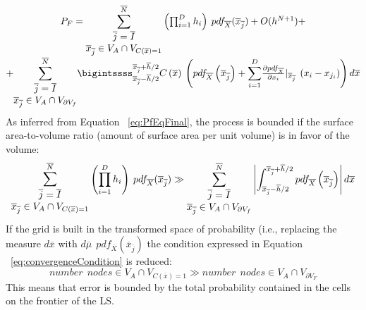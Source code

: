  \begin{equation}
 \label{eq:PfEqFinal}
 \begin{matrix}
P_{F} = \mathlarger{\sum}_{\begin{matrix}
\overline{j}=\overline{I} \\ \overline{x}_{\overline{j}} \in V_{A} \cap 
V_{C(\overline{x})=1} \end{matrix}}^{\overline{N}} 
\left ( \prod_{i=1}^{D} 
 h_{i} \right ) 
\: pdf_{\overline{X}} ( \overline{x}_{\overline{j}}) + O(h^{N+1}) +
 \\
 + \mathlarger{\sum}_{\begin{matrix}
\overline{j}=\overline{I} \\ \overline{x}_{\overline{j}} \in V_{A} \cap 
V_{\partial V_{f}} \end{matrix}}^{\overline{N}}
\bigintssss_{\overline{x}_{\overline{j}} - 
\overline{h}/2}^{\overline{x}_{\overline{j}} + \overline{h}/2} C\left ( 
\overline{x} \right )\: \left ( pdf_{\overline{X}}\left ( 
\overline{x}_{\overline{j}} \right ) +
\mathlarger{\sum}_{i=1}^{D} \frac{\partial pdf_{\overline{X}}}{\partial 
x_{i}}|_{\overline{x}_{\overline{j}}} \: \left ( x_{i} - x_{j_{i}} \right ) \right )   
d\overline{x}
\end{matrix} 
 \end{equation} 
As inferred from Equation ~\ref{eq:PfEqFinal}, the process is bounded if the 
surface area-to-volume ratio (amount of surface area per unit volume) is 
in favor of the volume:
\begin{equation}
\label{eq:convergenceCondition}
\mathlarger{\sum}_{\begin{matrix}
\overline{j}=\overline{I} \\ \overline{x}_{\overline{j}} \in V_{A} \cap 
V_{C(\overline{x})=1} \end{matrix}}^{\overline{N}} 
\left ( \prod_{i=1}^{D} 
 h_{i} \right ) 
\: pdf_{\overline{X}} ( \overline{x}_{\overline{j}})
\gg 
\sum_{\begin{matrix}
\overline{j}=\overline{I} \\ \overline{x}_{\overline{j}} \in V_{A} \cap 
V_{\partial V_{f}} \end{matrix}}^{\overline{N}}
\left | \int_{\overline{x}_{\overline{j}} - 
\overline{h}/2}^{\overline{x}_{\overline{j}} + \overline{h}/2}   pdf_{\overline{X}}\left ( 
\overline{x}_{\overline{j}} \right )  \right |
d\overline{x}
\end{equation}
If the grid is built in the transformed space of probability (i.e., replacing the measure $d\overline{x}$ with $d \overline{\mu }\: \: pdf_{\overline{X}}\left ( \overline{x}_{\overline{j}} \right )$ the condition expressed in Equation ~\ref{eq:convergenceCondition} is reduced:
\begin{equation}
number \: \:  nodes \in V_{A} \cap V_{C(\overline{x})=1} \gg number \: \:  nodes  \in V_{A} \cap V_{\partial V_{F}}
\end{equation}
This means that error is bounded by the total probability contained in the cells on the frontier of the LS.

